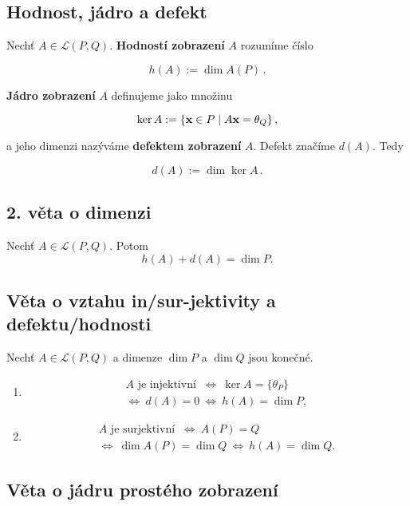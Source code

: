 \subsection*{Hodnost, jádro a defekt}

Nechť $A\in\mathcal L(P,Q)$. \textbf{Hodností zobrazení} $A$ rozumíme číslo

\[ h(A):=\dim A(P)\,. \]

\noindent \textbf{Jádro zobrazení} $A$ definujeme jako množinu

\[ \ker A:=\{\mathbf{x}\in P\mid A\mathbf{x}=\theta_Q\}\,, \]

\noindent a jeho dimenzi nazýváme \textbf{defektem zobrazení} $A$. Defekt značíme $d(A)$. Tedy

\[ d(A):=\dim \ker A\,. \]

\subsection*{2. věta o dimenzi}

Nechť $A\in\mathcal L(P,Q)$. Potom
\[ h(A)+d(A)=\dim P. \]

\subsection*{Věta o vztahu in/sur-jektivity a defektu/hodnosti}

Nechť $A\in\mathcal L(P,Q)$ a dimenze $\dim P$ a $\dim Q$ jsou konečné.

\begin{enumerate}
      \item \begin{gather*}
                  A \text{ je injektivní } \ \Leftrightarrow\ \ker A=\{\theta_P\}\\
                  \Leftrightarrow\  d(A)=0 \ \Leftrightarrow\  h(A)=\dim P,
            \end{gather*}
      \item \begin{gather*}
                  A \text{ je surjektivní }\ \Leftrightarrow\ A(P)=Q \\
                  \Leftrightarrow\ \dim A(P)=\dim Q \ \Leftrightarrow\ h(A)=\dim Q.
            \end{gather*}
\end{enumerate}

\subsection*{Věta o jádru prostého zobrazení}

